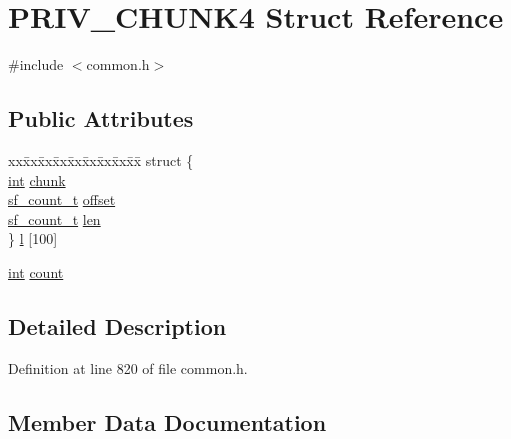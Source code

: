 \hypertarget{struct_p_r_i_v___c_h_u_n_k4}{}\section{P\+R\+I\+V\+\_\+\+C\+H\+U\+N\+K4 Struct Reference}
\label{struct_p_r_i_v___c_h_u_n_k4}


{\ttfamily \#include $<$common.\+h$>$}

\subsection*{Public Attributes}
\begin{DoxyCompactItemize}
\item 
\begin{tabbing}
xx\=xx\=xx\=xx\=xx\=xx\=xx\=xx\=xx\=\kill
struct \{\\
\>\hyperlink{xmltok_8h_a5a0d4a5641ce434f1d23533f2b2e6653}{int} \hyperlink{struct_p_r_i_v___c_h_u_n_k4_a76248fdb060bc9f9a0ce334866284199}{chunk}\\
\>\hyperlink{mac_2config_2i386_2lib-src_2libsndfile_2src_2sndfile_8h_a398121a5f562230ea7f772528fff5f84}{sf\_count\_t} \hyperlink{struct_p_r_i_v___c_h_u_n_k4_a0851f44c08130d1146cba65064e2b4e6}{offset}\\
\>\hyperlink{mac_2config_2i386_2lib-src_2libsndfile_2src_2sndfile_8h_a398121a5f562230ea7f772528fff5f84}{sf\_count\_t} \hyperlink{struct_p_r_i_v___c_h_u_n_k4_ac75f24f4ec5ffd8629f200b02df90d30}{len}\\
\} \hyperlink{struct_p_r_i_v___c_h_u_n_k4_ac581347d158ac354b6d029ddde29dd27}{l} \mbox{[}100\mbox{]}\\

\end{tabbing}\item 
\hyperlink{xmltok_8h_a5a0d4a5641ce434f1d23533f2b2e6653}{int} \hyperlink{struct_p_r_i_v___c_h_u_n_k4_ad526a2b64e94930cbf28cd7f65c856f5}{count}
\end{DoxyCompactItemize}


\subsection{Detailed Description}


Definition at line 820 of file common.\+h.



\subsection{Member Data Documentation}
